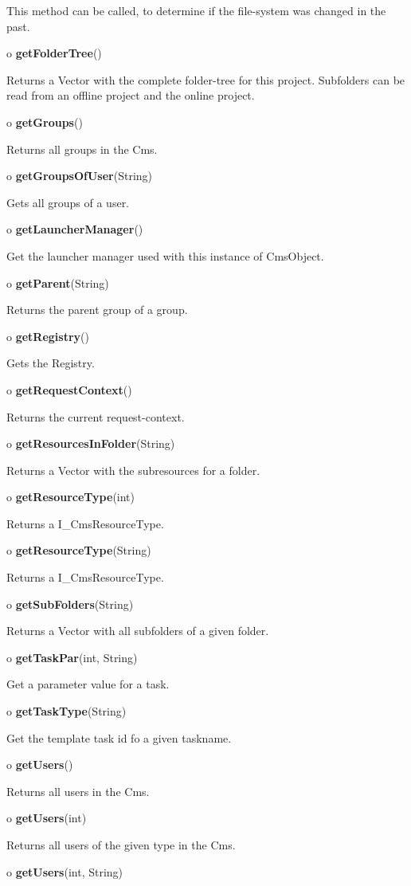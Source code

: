 \begin{description}
This method can be called, to determine if the file-system was changed in the
past.  
\item o {\bf getFolderTree}()  

Returns a Vector with the complete folder-tree for this project.\htmlBR
Subfolders can be read from an offline project and the online project.  
\item o {\bf getGroups}()  

Returns all groups in the Cms.  
\item o {\bf getGroupsOfUser}(String)  

Gets all groups of a user.  
\item o {\bf getLauncherManager}()  

Get the launcher manager used with this instance of CmsObject.  
\item o {\bf getParent}(String)  

Returns the parent group of a group.  
\item o {\bf getRegistry}()  

Gets the Registry.  
\item o {\bf getRequestContext}()  

Returns the current request-context.  
\item o {\bf getResourcesInFolder}(String)  

Returns a Vector with the subresources for a folder.\htmlBR
\item o {\bf getResourceType}(int)  

Returns a I\_CmsResourceType.  
\item o {\bf getResourceType}(String)  

Returns a I\_CmsResourceType.  
\item o {\bf getSubFolders}(String)  

Returns a Vector with all subfolders of a given folder.  
\item o {\bf getTaskPar}(int, String)  

Get a parameter value for a task.  
\item o {\bf getTaskType}(String)  

Get the template task id fo a given taskname.  
\item o {\bf getUsers}()  

Returns all users in the Cms.  
\item o {\bf getUsers}(int)  

Returns all users of the given type in the Cms.  
\item o {\bf getUsers}(int, String)  


\end{description}
